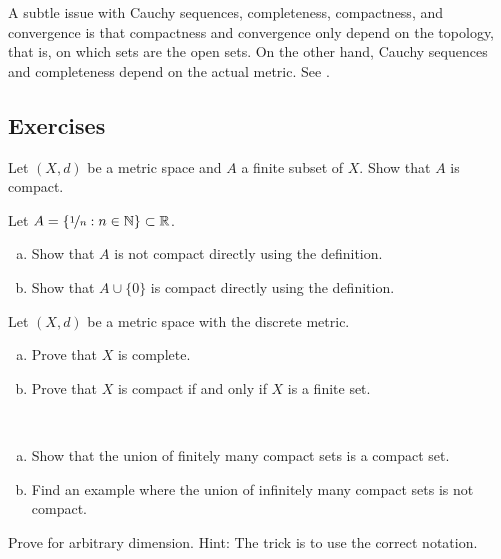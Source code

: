 \begin{remark}
A subtle issue with Cauchy sequences, completeness, compactness,
and convergence is that compactness and convergence only depend on the
topology, that is, on which sets are the open sets.  On the other hand,
Cauchy sequences and completeness depend on the actual metric.
See .
\end{remark}

\subsection{Exercises}

\begin{exercise}
Let $(X,d)$ be a metric space and $A$ a finite subset of $X$.
Show that $A$ is compact.
\end{exercise}

\begin{exercise}
Let $A = \{ \nicefrac{1}{n} : n \in {\mathbb{N}} \} \subset {\mathbb{R}}$.
\begin{enumerate}[a)]
\item
Show that $A$ is
not compact directly using the definition.
\item
Show that $A \cup \{ 0 \}$ is
compact directly using the definition.
\end{enumerate}
\end{exercise}


\begin{exercise}
Let $(X,d)$ be a metric space with the discrete metric.
\begin{enumerate}[a)]
\item
Prove that $X$ is complete.
\item
Prove that $X$ is compact if and only if $X$ is a finite set.
\end{enumerate}
\end{exercise}

\begin{exercise}
{\ }
\begin{enumerate}[a)]
\item
Show that the union of finitely many compact sets is a compact set.
\item
Find an example where the union of infinitely many compact sets is not
compact.
\end{enumerate}
\end{exercise}

\begin{exercise}
Prove  for arbitrary dimension.
Hint: The trick is to use the correct notation.
\end{exercise}


